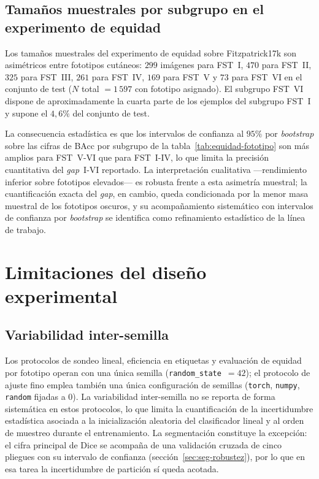 \subsection{Tamaños muestrales por subgrupo en el experimento de equidad}
\label{sec:lim-muestrales}

Los tamaños muestrales del experimento de equidad sobre
Fitzpatrick17k son asimétricos entre fototipos cutáneos: $299$
imágenes para FST~I, $470$ para FST~II, $325$ para FST~III,
$261$ para FST~IV, $169$ para FST~V y $73$ para FST~VI
en el conjunto de test ($N$ total $=1\,597$ con fototipo
asignado). El subgrupo FST~VI dispone de aproximadamente la cuarta
parte de los ejemplos del subgrupo FST~I y supone el $4{,}6\%$
del conjunto de test.

La consecuencia estadística es que los intervalos de confianza al
$95\%$ por \emph{bootstrap} sobre las cifras de
BAcc por subgrupo de la tabla~\ref{tab:equidad-fototipo} son más
amplios para FST~V-VI que para FST~I-IV, lo que limita la
precisión cuantitativa del \emph{gap}~I-VI reportado. La
interpretación cualitativa ---rendimiento inferior sobre fototipos
elevados--- es robusta frente a esta asimetría muestral; la
cuantificación exacta del \emph{gap}, en cambio, queda condicionada
por la menor masa muestral de los fototipos oscuros, y su
acompañamiento sistemático con intervalos de confianza por
\emph{bootstrap} se identifica como refinamiento estadístico de la
línea de trabajo.

\section{Limitaciones del diseño experimental}
\label{sec:lim-diseno}

\subsection{Variabilidad inter-semilla}
\label{sec:lim-semilla}

Los protocolos de sondeo lineal, eficiencia en etiquetas y
evaluación de equidad por fototipo operan con una única semilla
(\texttt{random\_state}~$=42$); el protocolo de ajuste fino emplea
también una única configuración de
semillas (\texttt{torch}, \texttt{numpy}, \texttt{random} fijadas a
$0$). La variabilidad inter-semilla no se reporta de forma
sistemática en estos protocolos, lo que limita la cuantificación de
la incertidumbre estadística asociada a la inicialización aleatoria
del clasificador lineal y al orden de muestreo durante el
entrenamiento. La segmentación constituye la excepción: el
cifra principal de Dice se acompaña de una validación cruzada de
cinco pliegues con su intervalo de confianza
(sección~\ref{sec:seg-robustez}), por lo que en esa tarea la
incertidumbre de partición sí queda acotada.

